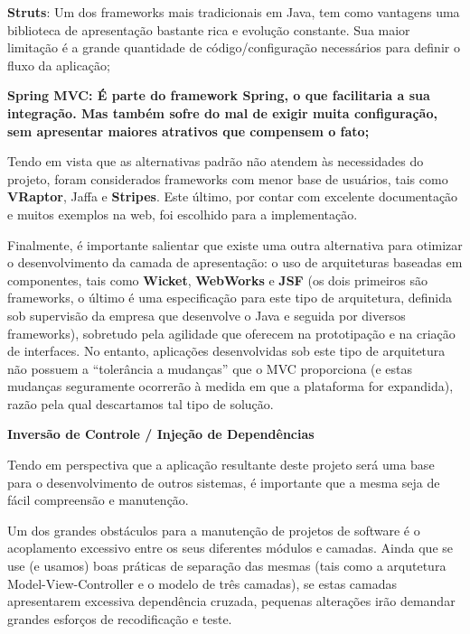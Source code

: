 \documentclass[12pt,twoside]{article}
\begin{document}
\textbf{\textup{Struts}}\textup{: Um dos frameworks mais tradicionais em
Java, tem como vantagens uma biblioteca de apresenta\c{c}\~ao bastante
rica e evolu\c{c}\~ao constante. Sua maior limita\c{c}\~ao \'e a grande
quantidade de c\'odigo/configura\c{c}\~ao necess\'arios para definir o
fluxo da aplica\c{c}\~ao;}

{\bfseries
\textup{Spring MVC}\textmd{\textup{: \'E parte do framework Spring, o
que facilitaria a sua integra\c{c}\~ao. Mas tamb\'em sofre do mal de
exigir muita configura\c{c}\~ao, sem apresentar maiores atrativos que
compensem o fato;}}}

{\upshape
\textmd{Tendo em vista que as alternativas padr\~ao n\~ao atendem \`as
necessidades do projeto, foram considerados frameworks com menor base
de usu\'arios, tais como }\textbf{VRaptor}\textmd{,
}\textmd{Jaffa}\textmd{ }\textmd{e }\textbf{Stripes}\textmd{. Este
\'ultimo, por contar com excelente documenta\c{c}\~ao e muitos exemplos
na web, foi escolhido para a implementa\c{c}\~ao.}}

{\upshape
Finalmente, \'e importante salientar que existe uma outra alternativa
para otimizar o desenvolvimento da camada de apresenta\c{c}\~ao: o uso
de arquiteturas baseadas em componentes, tais como
\textbf{Wicket}\textmd{, }\textbf{WebWorks}\textmd{ e
}\textbf{JSF}\textmd{ (os dois primeiros s\~ao frameworks, o \'ultimo
\'e uma especifica\c{c}\~ao para este tipo de arquitetura, definida sob
supervis\~ao da empresa que desenvolve o Java e seguida por diversos
frameworks), sobretudo pela agilidade que oferecem na
prototipa\c{c}\~ao e na cria\c{c}\~ao de interfaces. No entanto,
aplica\c{c}\~oes desenvolvidas sob este tipo de arquitetura n\~ao
possuem a ``toler\^ancia a mudan\c{c}as'' que o MVC proporciona (e
estas mudan\c{c}as seguramente ocorrer\~ao \`a medida em que a
plataforma for expandida), raz\~ao pela qual descartamos tal tipo de
solu\c{c}\~ao.}}

{\sffamily\bfseries\upshape
Invers\~ao de Controle / Inje\c{c}\~ao de Depend\^encias}

{\upshape
Tendo em perspectiva que a aplica\c{c}\~ao resultante deste projeto
ser\'a uma base para o desenvolvimento de outros sistemas, \'e
importante que a mesma seja de f\'acil compreens\~ao e
manuten\c{c}\~ao.}

{\upshape
Um dos grandes obst\'aculos para a manuten\c{c}\~ao de projetos de
software \'e o acoplamento excessivo entre os seus diferentes m\'odulos
e camadas. Ainda que se use (e usamos) boas pr\'aticas de
separa\c{c}\~ao das mesmas (tais como a arqutetura
Model{}-View{}-Controller e o modelo de tr\^es camadas), se estas
camadas apresentarem excessiva depend\^encia cruzada, pequenas
altera\c{c}\~oes ir\~ao demandar grandes esfor\c{c}os de
recodifica\c{c}\~ao e teste.}
\end{document}
